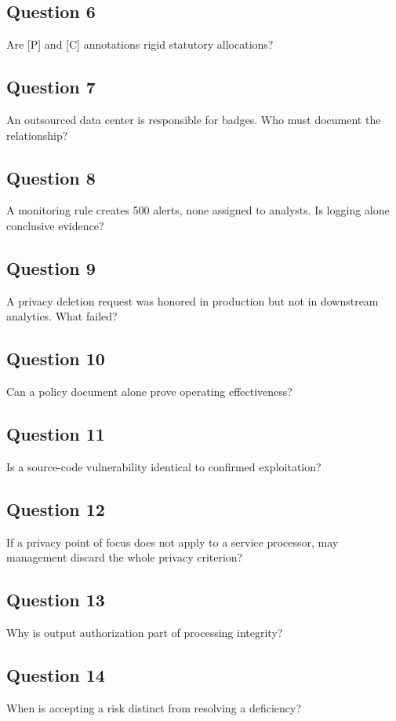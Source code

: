 \documentclass[10pt,oneside]{report}
\begin{document}
\subsection*{Question 6}
Are [P] and [C] annotations rigid statutory allocations?

\subsection*{Question 7}
An outsourced data center is responsible for badges. Who must document the relationship?

\subsection*{Question 8}
A monitoring rule creates 500 alerts, none assigned to analysts. Is logging alone conclusive evidence?

\subsection*{Question 9}
A privacy deletion request was honored in production but not in downstream analytics. What failed?

\subsection*{Question 10}
Can a policy document alone prove operating effectiveness?

\subsection*{Question 11}
Is a source-code vulnerability identical to confirmed exploitation?

\subsection*{Question 12}
If a privacy point of focus does not apply to a service processor, may management discard the whole privacy criterion?

\subsection*{Question 13}
Why is output authorization part of processing integrity?

\subsection*{Question 14}
When is accepting a risk distinct from resolving a deficiency?
\end{document}
